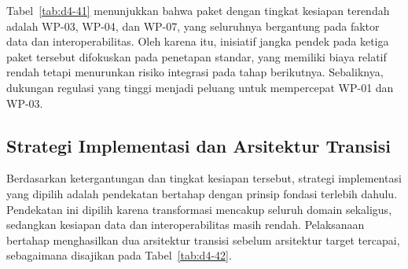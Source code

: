 Tabel~\ref{tab:d4-41} menunjukkan bahwa paket dengan tingkat kesiapan terendah adalah WP-03, WP-04, dan WP-07, yang seluruhnya bergantung pada faktor data dan interoperabilitas. Oleh karena itu, inisiatif jangka pendek pada ketiga paket tersebut difokuskan pada penetapan standar, yang memiliki biaya relatif rendah tetapi menurunkan risiko integrasi pada tahap berikutnya. Sebaliknya, dukungan regulasi yang tinggi menjadi peluang untuk mempercepat WP-01 dan WP-03.

\subsection{Strategi Implementasi dan Arsitektur Transisi}

Berdasarkan ketergantungan dan tingkat kesiapan tersebut, strategi implementasi yang dipilih adalah pendekatan bertahap dengan prinsip fondasi terlebih dahulu. Pendekatan ini dipilih karena transformasi mencakup seluruh domain sekaligus, sedangkan kesiapan data dan interoperabilitas masih rendah. Pelaksanaan bertahap menghasilkan dua arsitektur transisi sebelum arsitektur target tercapai, sebagaimana disajikan pada Tabel~\ref{tab:d4-42}.

